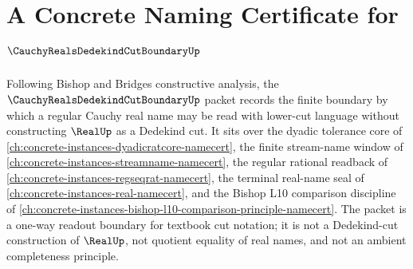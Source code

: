 \chapter{A Concrete Naming Certificate for $\CauchyRealsDedekindCutBoundaryUp$}
\label{ch:concrete-instances-cauchy-reals-dedekind-cut-boundary-namecert}

Following Bishop and Bridges constructive analysis, the $\CauchyRealsDedekindCutBoundaryUp$ packet records the finite boundary by which a regular Cauchy real name may be read with lower-cut language without constructing $\RealUp$ as a Dedekind cut. It sits over the dyadic tolerance core of \autoref{ch:concrete-instances-dyadicratcore-namecert}, the finite stream-name window of \autoref{ch:concrete-instances-streamname-namecert}, the regular rational readback of \autoref{ch:concrete-instances-regseqrat-namecert}, the terminal real-name seal of \autoref{ch:concrete-instances-real-namecert}, and the Bishop L10 comparison discipline of \autoref{ch:concrete-instances-bishop-l10-comparison-principle-namecert}. The packet is a one-way readout boundary for textbook cut notation; it is not a Dedekind-cut construction of $\RealUp$, not quotient equality of real names, and not an ambient completeness principle.

